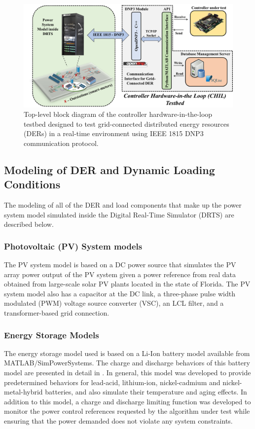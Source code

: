 \begin{figure}
\centering
  \includegraphics[width=\linewidth]{figs/overall_TB_2.png}
  \caption{Top-level block diagram of the controller hardware-in-the-loop testbed designed to test grid-connected distributed energy resources (DERs) in a real-time environment using IEEE 1815 DNP3 communication protocol.}
  \label{fig:overall_testbed}
\end{figure}


\subsection{Modeling of DER and Dynamic Loading Conditions}
The modeling of all of the DER and load components that make up the power system model simulated inside the Digital Real-Time Simulator (DRTS) are described below.

\subsubsection{Photovoltaic (PV) System models}
The PV system model is based on a DC power source that simulates the PV array power output of the PV system given a power reference from real data obtained from large-scale solar PV plants located in the state of Florida. The PV system model also has a capacitor at the DC link, a three-phase pulse width modulated (PWM) voltage source converter (VSC), an LCL filter, and a transformer-based grid connection.


\subsubsection{Energy Storage Models}
The energy storage model used is based on a Li-Ion battery model available from MATLAB/SimPowerSystems. The charge and discharge behaviors of this battery model are presented in detail in  \cite{tremblay}. In general, this model was developed to provide predetermined behaviors for lead-acid, lithium-ion, nickel-cadmium and nickel-metal-hybrid batteries, and also simulate their temperature and aging effects. In addition to this model, a charge and discharge limiting function was developed to monitor the power control references requested by the algorithm under test while ensuring that the power demanded does not violate any system constraints.


